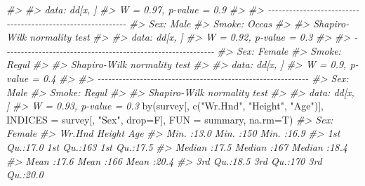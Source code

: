 \documentclass[
]{book}
\newenvironment{Shaded}{\begin{snugshade}}{\end{snugshade}}
\newcommand{\AttributeTok}[1]{\textcolor[rgb]{0.77,0.63,0.00}{#1}}
\newcommand{\CommentTok}[1]{\textcolor[rgb]{0.56,0.35,0.01}{\textit{#1}}}
\newcommand{\FunctionTok}[1]{\textcolor[rgb]{0.00,0.00,0.00}{#1}}
\newcommand{\NormalTok}[1]{#1}
\newcommand{\StringTok}[1]{\textcolor[rgb]{0.31,0.60,0.02}{#1}}
\begin{document}
\begin{Shaded}
\begin{Highlighting}[]
\CommentTok{\#\textgreater{} }
\CommentTok{\#\textgreater{} data:  dd[x, ]}
\CommentTok{\#\textgreater{} W = 0.97, p{-}value = 0.9}
\CommentTok{\#\textgreater{} }
\CommentTok{\#\textgreater{} {-}{-}{-}{-}{-}{-}{-}{-}{-}{-}{-}{-}{-}{-}{-}{-}{-}{-}{-}{-}{-}{-}{-}{-}{-}{-}{-}{-}{-}{-}{-}{-}{-}{-}{-}{-}{-}{-}{-}{-}{-}{-}{-}{-}{-}{-}{-}{-}{-}{-}{-}{-}{-}{-}{-}{-}{-}{-}{-}{-} }
\CommentTok{\#\textgreater{} Sex: Male}
\CommentTok{\#\textgreater{} Smoke: Occas}
\CommentTok{\#\textgreater{} }
\CommentTok{\#\textgreater{}  Shapiro{-}Wilk normality test}
\CommentTok{\#\textgreater{} }
\CommentTok{\#\textgreater{} data:  dd[x, ]}
\CommentTok{\#\textgreater{} W = 0.92, p{-}value = 0.3}
\CommentTok{\#\textgreater{} }
\CommentTok{\#\textgreater{} {-}{-}{-}{-}{-}{-}{-}{-}{-}{-}{-}{-}{-}{-}{-}{-}{-}{-}{-}{-}{-}{-}{-}{-}{-}{-}{-}{-}{-}{-}{-}{-}{-}{-}{-}{-}{-}{-}{-}{-}{-}{-}{-}{-}{-}{-}{-}{-}{-}{-}{-}{-}{-}{-}{-}{-}{-}{-}{-}{-} }
\CommentTok{\#\textgreater{} Sex: Female}
\CommentTok{\#\textgreater{} Smoke: Regul}
\CommentTok{\#\textgreater{} }
\CommentTok{\#\textgreater{}  Shapiro{-}Wilk normality test}
\CommentTok{\#\textgreater{} }
\CommentTok{\#\textgreater{} data:  dd[x, ]}
\CommentTok{\#\textgreater{} W = 0.9, p{-}value = 0.4}
\CommentTok{\#\textgreater{} }
\CommentTok{\#\textgreater{} {-}{-}{-}{-}{-}{-}{-}{-}{-}{-}{-}{-}{-}{-}{-}{-}{-}{-}{-}{-}{-}{-}{-}{-}{-}{-}{-}{-}{-}{-}{-}{-}{-}{-}{-}{-}{-}{-}{-}{-}{-}{-}{-}{-}{-}{-}{-}{-}{-}{-}{-}{-}{-}{-}{-}{-}{-}{-}{-}{-} }
\CommentTok{\#\textgreater{} Sex: Male}
\CommentTok{\#\textgreater{} Smoke: Regul}
\CommentTok{\#\textgreater{} }
\CommentTok{\#\textgreater{}  Shapiro{-}Wilk normality test}
\CommentTok{\#\textgreater{} }
\CommentTok{\#\textgreater{} data:  dd[x, ]}
\CommentTok{\#\textgreater{} W = 0.93, p{-}value = 0.3}
\FunctionTok{by}\NormalTok{(survey[,  }\FunctionTok{c}\NormalTok{(}\StringTok{"Wr.Hnd"}\NormalTok{, }\StringTok{"Height"}\NormalTok{, }\StringTok{"Age"}\NormalTok{)], }\AttributeTok{INDICES =}\NormalTok{ survey[, }\StringTok{"Sex"}\NormalTok{, }\AttributeTok{drop=}\NormalTok{F], }\AttributeTok{FUN =}\NormalTok{ summary, }\AttributeTok{na.rm=}\NormalTok{T)}
\CommentTok{\#\textgreater{} Sex: Female}
\CommentTok{\#\textgreater{}      Wr.Hnd         Height         Age      }
\CommentTok{\#\textgreater{}  Min.   :13.0   Min.   :150   Min.   :16.9  }
\CommentTok{\#\textgreater{}  1st Qu.:17.0   1st Qu.:163   1st Qu.:17.5  }
\CommentTok{\#\textgreater{}  Median :17.5   Median :167   Median :18.4  }
\CommentTok{\#\textgreater{}  Mean   :17.6   Mean   :166   Mean   :20.4  }
\CommentTok{\#\textgreater{}  3rd Qu.:18.5   3rd Qu.:170   3rd Qu.:20.0  }

\end{Highlighting}
\end{Shaded}
\end{document}
